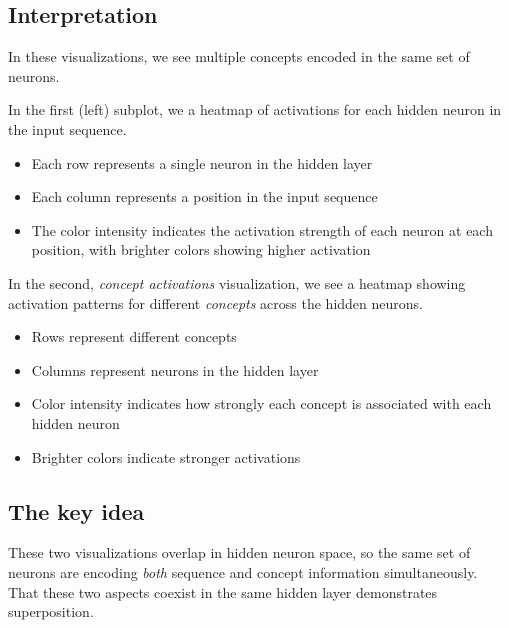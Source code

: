 \documentclass[
  letterpaper,
  DIV=11,
  numbers=noendperiod]{scrreprt}
\providecommand{\tightlist}{%
  \setlength{\itemsep}{0pt}\setlength{\parskip}{0pt}}\usepackage{longtable,booktabs,array}
\begin{document}
\subsection{Interpretation}\label{interpretation-2}

In these visualizations, we see multiple concepts encoded in the same
set of neurons.

In the first (left) subplot, we a heatmap of activations for each hidden
neuron in the input sequence.

\begin{itemize}
\tightlist
\item
  Each row represents a single neuron in the hidden layer
\item
  Each column represents a position in the input sequence
\item
  The color intensity indicates the activation strength of each neuron
  at each position, with brighter colors showing higher activation
\end{itemize}

In the second, \emph{concept activations} visualization, we see a
heatmap showing activation patterns for different \emph{concepts} across
the hidden neurons.

\begin{itemize}
\tightlist
\item
  Rows represent different concepts
\item
  Columns represent neurons in the hidden layer
\item
  Color intensity indicates how strongly each concept is associated with
  each hidden neuron
\item
  Brighter colors indicate stronger activations
\end{itemize}

\subsection{The key idea}\label{the-key-idea}

These two visualizations overlap in hidden neuron space, so the same set
of neurons are encoding \emph{both} sequence and concept information
simultaneously. That these two aspects coexist in the same hidden layer
demonstrates superposition.
\end{document}

